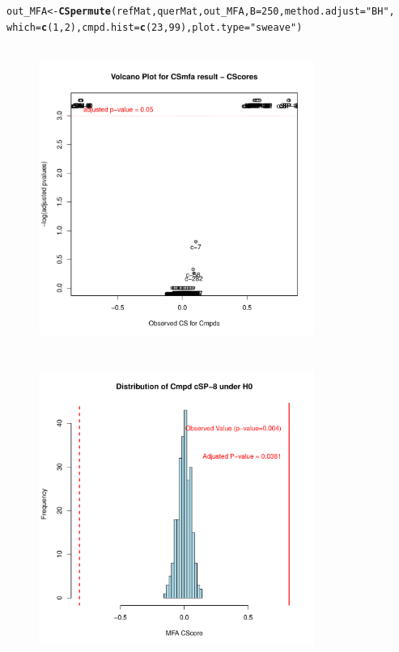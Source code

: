 \documentclass[a4paper]{article}\usepackage[]{graphicx}\usepackage[]{color}
\makeatletter
\newcommand{\hlnum}[1]{\textcolor[rgb]{0.686,0.059,0.569}{#1}}%
\newcommand{\hlstr}[1]{\textcolor[rgb]{0.192,0.494,0.8}{#1}}%
\newcommand{\hlstd}[1]{\textcolor[rgb]{0.345,0.345,0.345}{#1}}%
\newcommand{\hlkwb}[1]{\textcolor[rgb]{0.69,0.353,0.396}{#1}}%
\newcommand{\hlkwc}[1]{\textcolor[rgb]{0.333,0.667,0.333}{#1}}%
\newcommand{\hlkwd}[1]{\textcolor[rgb]{0.737,0.353,0.396}{\textbf{#1}}}%
\newenvironment{kframe}{%
 \def\at@end@of@kframe{}%
 \ifinner\ifhmode%
  \def\at@end@of@kframe{\end{minipage}}%
  \begin{minipage}{\columnwidth}%
 \fi\fi%
 \def\FrameCommand##1{\hskip\@totalleftmargin \hskip-\fboxsep
 \colorbox{shadecolor}{##1}\hskip-\fboxsep
     \hskip-\linewidth \hskip-\@totalleftmargin \hskip\columnwidth}%
 \MakeFramed {\advance\hsize-\width
   \@totalleftmargin\z@ \linewidth\hsize
   \@setminipage}}%
 {\par\unskip\endMakeFramed%
 \at@end@of@kframe}
\newenvironment{knitrout}{}{} %
\makeatother
\begin{document}
\begin{knitrout}
\color{fgcolor}\begin{kframe}
\begin{alltt}
\hlstd{out_MFA} \hlkwb{<-} \hlkwd{CSpermute}\hlstd{(refMat,querMat,out_MFA,}\hlkwc{B}\hlstd{=}\hlnum{250}\hlstd{,}\hlkwc{method.adjust}\hlstd{=}\hlstr{"BH"}\hlstd{,}
                \hlkwc{which}\hlstd{=}\hlkwd{c}\hlstd{(}\hlnum{1}\hlstd{,}\hlnum{2}\hlstd{),}\hlkwc{cmpd.hist}\hlstd{=}\hlkwd{c}\hlstd{(}\hlnum{23}\hlstd{,}\hlnum{99}\hlstd{),}\hlkwc{plot.type}\hlstd{=}\hlstr{"sweave"}\hlstd{)}
\end{alltt}
\end{kframe}\begin{figure}[H]


\includegraphics[width=9cm,height=10cm]{figure/CSpermuteplots-1} 
\includegraphics[width=9cm,height=10cm]{figure/CSpermuteplots-2} 

\end{figure}
\end{knitrout}
\end{document}
